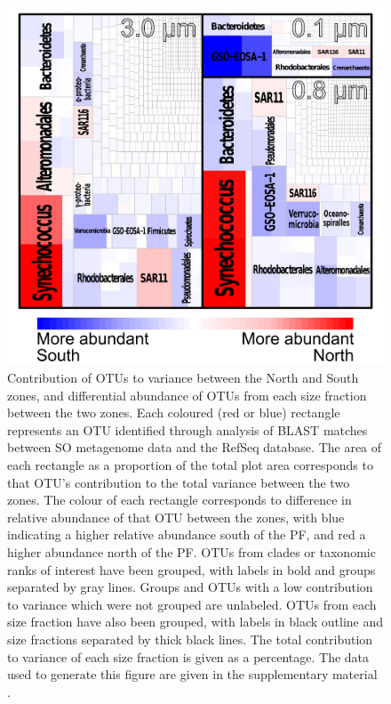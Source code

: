 \begin{figure}
  \centering
  \includegraphics[width=\textwidth]{../polarfront/taxotreemap.png}
  \caption[Contribution of \acp{OTU} to variance between the North and South zones]{Contribution of \acp{OTU} to variance between the North and South zones, and differential abundance of \acp{OTU} from each size fraction between the two zones.
Each coloured (red or blue) rectangle represents an OTU identified through analysis of BLAST matches between SO metagenome data and the RefSeq database.
The area of each rectangle as a proportion of the total plot area corresponds to that \ac{OTU}'s contribution to the total variance between the two zones.
The colour of each rectangle corresponds to difference in relative abundance of that OTU between the zones, with blue indicating a higher relative abundance south of the PF, and red a higher abundance north of the PF.
\acp{OTU} from clades or taxonomic ranks of interest have been grouped, with labels in bold and groups separated by gray lines. 
Groups and \acp{OTU} with a low contribution to variance which were not grouped are unlabeled.
\acp{OTU} from each size fraction have also been grouped, with labels in black outline and size fractions separated by thick black lines. 
The total contribution to variance of each size fraction is given as a percentage.
The data used to generate this figure are given in the supplementary material .
  }
  \label{fig:taxotreemap}
\end{figure}
